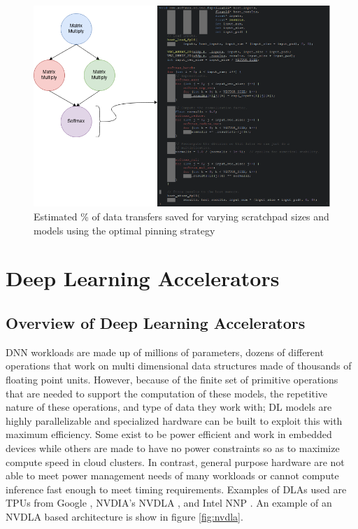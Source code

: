 \begin{figure}[th]
\centering
\includegraphics[scale=0.5]{Figures/operator_to_kernel.png}
\decoRule
\caption[operatorKernel]{Estimated \% of data transfers saved for varying scratchpad sizes and models using the optimal pinning strategy}
\label{fig:OperatorKernel}
\end{figure}


\section{Deep Learning Accelerators}

\subsection{Overview of Deep Learning Accelerators}
DNN workloads are made up of millions of
parameters, dozens of different operations that work on multi dimensional data
structures made of thousands of floating point units. However, because of the
finite set of primitive operations that are needed to support the computation
of these models, the repetitive nature of these operations, and type of data
they work with; DL models are highly parallelizable and specialized hardware
can be built to exploit this with maximum efficiency. Some exist to be power
efficient and work in embedded devices while others are made to have no power
constraints so as to maximize compute speed in cloud clusters. In contrast, general
purpose hardware are not able to meet power management needs of many workloads
or cannot compute inference fast enough to meet timing requirements. Examples
of DLAs used are TPUs from Google \cite{tensorflow}, NVDIA's NVDLA \cite{nvdla}, and Intel NNP \cite{nnp}.
An example of an NVDLA based architecture is show in figure \ref{fig:nvdla}.


